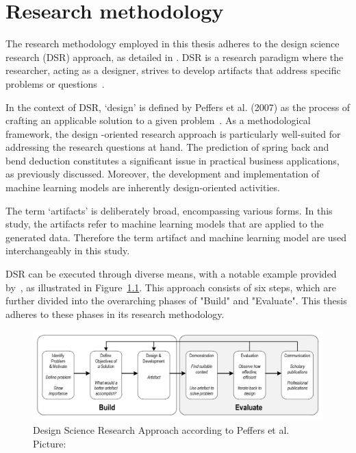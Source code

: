 \chapter{Research methodology}\label{ch:research-methodology}

The research methodology employed in this thesis adheres to the design science research (DSR) approach, as detailed
in \cite[p. 17]{rennenkampff_managementitagilitaetentwicklung_2015}.
DSR is a research paradigm where the researcher, acting as a designer, strives to develop artifacts that address
specific problems or questions~\cite[p. 10]{hevner_designscienceresearch_2010}.

In the context of DSR, `design' is defined by Peffers et al. (2007) as the process of crafting an applicable solution
to a given problem~\cite[p.47]{peffers_designscienceresearch_2007}.
As a methodological framework, the design -oriented research approach is particularly well-suited for addressing the
research questions at hand.
The prediction of spring back and bend deduction constitutes a significant issue in practical business applications,
as previously discussed.
Moreover, the development and implementation of machine learning models are inherently design-oriented activities.

The term `artifacts' is deliberately broad, encompassing various forms.
In this study, the artifacts refer to machine learning models that are applied to the generated data.
Therefore the term artifact and machine learning model are used interchangeably in this study.

DSR can be executed through diverse means, with a notable example provided by~\cite{peffers_designscienceresearch_2007},
as illustrated in Figure~\ref{fig:dsr_process}.
This approach consists of six steps, which are further divided into the overarching phases of "Build" and "Evaluate".
This thesis adheres to these phases in its research methodology.

\begin{figure}[h]
    \begin{tcolorbox}[arc=0pt,boxrule=0.5pt]
        \centering
        \includegraphics[width=1\linewidth]{chap3/images/dsr_process}
        \caption[DSR Process]{Design Science Research Approach according to Peffers et al.
        Picture:~\cite[p. 72]{sonnenberg_evaluationpatternsdesign_2012}}
        \label{fig:dsr_process}
    \end{tcolorbox}
\end{figure}

